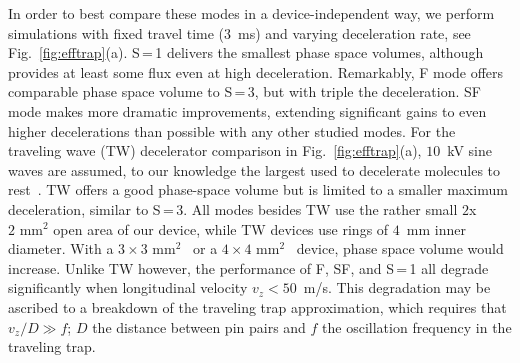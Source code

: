 \documentclass[%
 reprint,
 amsmath,amssymb,
 aps,
prl,
]{revtex4-1}
\begin{document}
In order to best compare these modes in a device-independent way, we perform simulations with fixed travel time ($3$~ms) and varying deceleration rate, see Fig.~\ref{fig:efftrap}(a).
S\,=\,1 delivers the smallest phase space volumes, although provides at least some flux even at high deceleration.
Remarkably, F mode offers comparable phase space volume to S\,=\,3, but with triple the deceleration.
SF mode makes more dramatic improvements, extending significant gains to even higher decelerations than possible with any other studied modes.
For the traveling wave (TW) decelerator comparison in Fig.~\ref{fig:efftrap}(a), $10$~kV sine waves are assumed, to our knowledge the largest used to decelerate molecules to rest~\cite{Quintero-Perez2013}. TW offers a good phase-space volume but is limited to a smaller maximum deceleration, similar to S\,=\,3.  
All modes besides TW use the rather small $2$x$2\text{ mm}^2$ open area of our device, while TW devices use rings of $4$~mm inner diameter.
With a $3\times3\text{ mm}^2$~\cite{Scharfenberg2009} or a $4\times4\text{ mm}^2$~\cite{VandeMeerakker2005} device, phase space volume would increase.
Unlike TW however, the performance of F, SF, and S\,=\,1 all degrade significantly when longitudinal velocity $v_z < 50$~m/s. 
This degradation may be ascribed to a breakdown of the traveling trap approximation, which requires that $v_z/D \gg f$; $D$ the distance between pin pairs and $f$ the oscillation frequency in the traveling trap.
\end{document}
